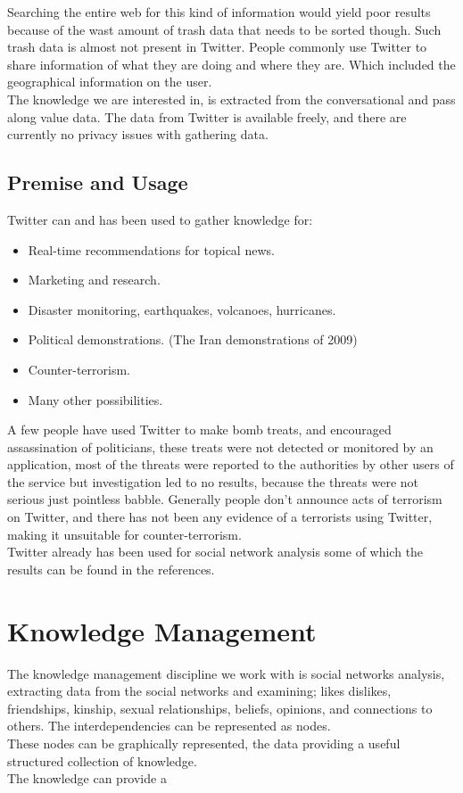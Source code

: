 \documentclass[]{article}  %
\begin{document}
Searching the entire web for this kind of information would yield poor results because of the wast amount of trash data that needs to be sorted though. Such trash data is almost not present in Twitter. People commonly use Twitter to share information of what they are doing and where they are. Which included the geographical information on the user.\\ The knowledge we are interested in, is extracted from the conversational and pass along value data. The data from Twitter is available freely, and there are currently no privacy issues with gathering data.

\subsection{Premise and Usage}
Twitter can and has been used to gather knowledge for:

\begin{itemize}
	\item Real-time recommendations for topical news. \cite{bib5}
	\item Marketing and research.
	\item Disaster monitoring, earthquakes, volcanoes, hurricanes. \cite{bib7}
	\item Political demonstrations. (The Iran demonstrations of 2009)
	\item Counter-terrorism.
	\item Many other possibilities.
\end{itemize}

A few people have used Twitter to make bomb treats, and encouraged assassination of politicians, these treats were not detected or monitored by an application, most of the threats were reported to the authorities by other users of the service but investigation  led to no results, because the threats were not serious just pointless babble. Generally people don't announce acts of terrorism on Twitter, and there has not been any evidence of a terrorists using Twitter, making it unsuitable for counter-terrorism. \\ Twitter already has been used for social network analysis some of which the results can be found in the references.

\section{Knowledge Management}
The knowledge management discipline we work with is social networks analysis, extracting data from the social networks and examining; likes dislikes, friendships, kinship, sexual relationships, beliefs, opinions, and connections to others. The interdependencies can be represented as nodes. \\ These nodes can be graphically represented, the data providing a useful structured collection of knowledge. \\  The knowledge can provide a 
\end{document}
